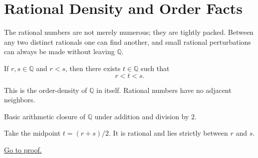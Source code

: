 
\section{Rational Density and Order Facts}
\label{sec:rational-density-and-order}

The rational numbers are not merely numerous; they are tightly packed.  Between
any two distinct rationals one can find another, and small rational
perturbations can always be made without leaving $\mathbb{Q}$.

\begin{tcolorbox}[colback=thmbox, colframe=thmborder, arc=2pt,
  left=6pt, right=6pt, top=4pt, bottom=4pt,
  title={\small\textbf{Theorem (Between Any Two Rational Numbers Lies Another Rational)}},
  fonttitle=\small\bfseries]
\begin{theorem}
\label{thm:between-any-two-rationals-is-a-rational}
If $r,s\in\mathbb{Q}$ and $r<s$, then there exists $t\in\mathbb{Q}$ such that
\[
r<t<s.
\]
\end{theorem}
\end{tcolorbox}

\begin{remark*}[Interpretation]
This is the order-density of $\mathbb{Q}$ in itself.  Rational numbers have no
adjacent neighbors.
\end{remark*}

\begin{remark*}[Dependencies]
Basic arithmetic closure of $\mathbb{Q}$ under addition and division by $2$.
\end{remark*}

\begin{remark*}
Take the midpoint $t=(r+s)/2$.  It is rational and lies strictly between $r$
and $s$.
\end{remark*}

\begin{remark*}[Proof]
\hyperref[prf:between-any-two-rationals-is-a-rational]{Go to proof.}
\end{remark*}

